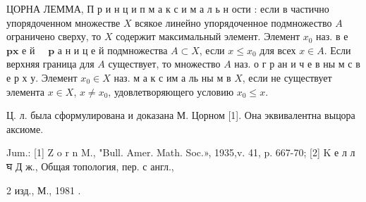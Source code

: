 \documentclass[10pt]{article}
\begin{document}
ЦОРНА ЛЕММА, П р и н ц и п м а к с и м а л ь н ости : если в частично упорядоченном множестве $X$ всякое линейно упорядоченное подмножество $A$ ограничено сверху, то $X$ содержит максимальный элемент. Элемент $x_{0}$ наз. в е $\mathbf{p} \mathbf{x}$ е й $\quad \mathbf{p}$ а н и ц е й подмножества $A \subset X$, если $x \leqslant x_{0}$ для всех $x \in A$. Если верхняя граница для $A$ существует, то множество $A$ наз. о г р ан и ч е в ны м с в е р х у. Элемент $x_{0} \in X$ наз. м а к с им а ль ны м в $X$, если не существует элемента $x \in X$, $x \neq x_{0}$, удовлетворяющего условию $x_{0} \leqslant x$.



Ц. л. была сформулирована и доказана М. Цорном [1]. Она эквивалентна выцора аксиоме.



Jum.: [1] Z o r n M., "Bull. Amer. Math. Soc.», 1935,v. 41, p. 667-70; [2] K е л л घ Д ж., Общая топология, пер. с англ.,

2 изд., М., 1981 .
\end{document}

